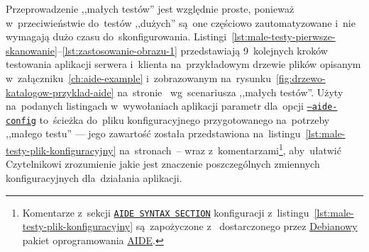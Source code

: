 \documentclass[thesis]{subfiles}
\begin{document}
Przeprowadzenie ,,małych testów'' jest względnie proste, ponieważ w~przeciwieństwie do~testów ,,dużych'' są~one częściowo zautomatyzowane i~nie wymagają dużo czasu do~skonfigurowania. Listingi~\ref{lst:male-testy-pierwsze-skanowanie}--\ref{lst:zastosowanie-obrazu-1} przedstawiają 9~kolejnych kroków testowania aplikacji serwera i~klienta na~przykładowym drzewie plików opisanym w~załączniku~\ref{ch:aide-example} i~zobrazowanym na~rysunku~\ref{fig:drzewo-katalogow-przyklad-aide} na~stronie~\pageref{fig:drzewo-katalogow-przyklad-aide} wg~scenariusza ,,małych testów''. Użyty na~podanych listingach w~wywołaniach aplikacji \texttt{\srvappname{}} parametr  dla~opcji \hyperlink{itm:aide-config}{\texttt{--aide-config}} to~ścieżka do~pliku konfiguracyjnego przygotowanego na~potrzeby ,,małego testu'' --- jego zawartość została przedstawiona na~listingu~\ref{lst:male-testy-plik-konfiguracyjny} na~stronach~\pageref{lst:male-testy-plik-konfiguracyjny}--\pageref{male-testy-plik-konfiguracyjny-last-page} wraz z~komentarzami\footnote{Komentarze z~sekcji \hyperref[line:aide-syntax-section]{\texttt{AIDE SYNTAX SECTION}} konfiguracji  z~listingu~\ref{lst:male-testy-plik-konfiguracyjny} są~zapożyczone z~  dostarczonego przez \href{https://packages.debian.org/search?keywords=aide}{Debianowy} pakiet oprogramowania \hyperref[sec:aide]{AIDE}.}, aby~ułatwić Czytelnikowi zrozumienie jakie jest znaczenie poszczególnych zmiennych konfiguracyjnych dla~działania aplikacji.
\end{document}
